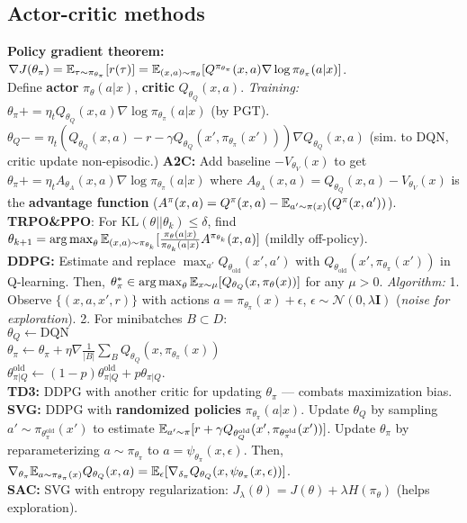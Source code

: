 \subsection{Actor-critic methods}
\textbf{Policy gradient theorem:} 
$\nabla J(\theta_\pi) = \mathbb{E}_{\tau\sim\pi_{\theta_\pi}}[r(\tau)] = \mathbb{E}_{(x,a)\sim\pi_\theta}[Q^{\pi_{\theta_\pi}}(x,a)\nabla\log\pi_{\theta_\pi}(a|x)]$.\\
Define \textbf{actor} $\pi_\theta(a|x)$, \textbf{critic} $Q_{\theta_Q}(x,a)$. \emph{Training:} $\theta_\pi \mathrel{{+}{=}} \eta_t Q_{\theta_Q}(x,a)\nabla\log\pi_{\theta_\pi}(a|x)$ (by PGT).\\
$\theta_Q \mathrel{{-}{=}} \eta_t(Q_{\theta_Q}(x,a)-r-\gamma Q_{\theta_Q}(x',\pi_{\theta_\pi}(x')))\nabla Q_{\theta_Q}(x,a)$
(sim. to DQN, critic update non-episodic.)
\textbf{A2C:} Add baseline $-V_{\theta_V}(x)$ to get
$\theta_\pi \mathrel{{+}{=}} \eta_t A_{\theta_A}(x,a)\nabla\log\pi_{\theta_\pi}(a|x)$ where $A_{\theta_A}(x,a) = Q_{\theta_Q}(x,a) - V_{\theta_V}(x)$ is the \textbf{advantage function} ($A^\pi(x,a) = Q^{\pi}(x,a)-\mathbb{E}_{a'\sim\pi(x)}(Q^{\pi}(x,a'))$).\\
\textbf{TRPO\&PPO}: For $\mathrm{KL}(\theta||\theta_k)\leq\delta$, find $\theta_{k+1} = \operatorname*{arg\,max}_\theta \mathbb{E}_{(x,a)\sim\pi_{\theta_k}}[\frac{\pi_\theta(a|x)}{\pi_{\theta_k}(a|x)}A^{\pi_{\theta_k}}(x,a)]$ (mildly off-policy).\\
\textbf{DDPG:} Estimate and replace $\max_{a'}Q_{\theta_\mathrm{old}}(x',a')$ with $Q_{\theta_{\mathrm{old}}}(x', \pi_{\theta_\pi}(x'))$ in Q-learning. Then, $\theta^*_{\pi}\in\operatorname*{arg\,max}_\theta \mathbb{E}_{x\sim\mu}[Q_{\theta_Q}(x,\pi_\theta(x))]$ for any $\mu > 0$. \emph{Algorithm:} 1. Observe $\{(x,a,x',r)\}$ with actions $a=\pi_{\theta_\pi}(x)+\epsilon$, $\epsilon\sim\mathcal{N}(0,\lambda\mathbf{I})$ (\emph{noise for exploration}). 2. For minibatches $B\subset D$:\\
$\theta_Q \leftarrow \mathrm{DQN}$\\
$\theta_\pi \leftarrow \theta_\pi +\eta\nabla\frac{1}{|B|}\sum_B Q_{\theta_Q}(x,\pi_{\theta_\pi}(x))$\\
$\theta^{\mathrm{old}}_{\pi | Q} \leftarrow (1-p)\theta^{\mathrm{old}}_{\pi | Q} + p\theta_{\pi | Q}$.\\
\textbf{TD3:} DDPG with another critic for updating $\theta_\pi$ --- combats maximization bias.\\
\textbf{SVG:} DDPG with \textbf{randomized policies} $\pi_{\theta_\pi}(a|x)$. Update $\theta_Q$ by sampling $a'\sim\pi_{\theta^\mathrm{old}_\pi}(x')$ to estimate $\mathbb{E}_{a'\sim\pi}[r+\gamma Q_{\theta^\mathrm{old}_Q}(x',\pi_{\theta^\mathrm{old}_\pi}(x'))]$. Update $\theta_\pi$ by reparameterizing $a\sim\pi_{\theta_\pi}$ to $a=\psi_{\theta_\pi}(x,\epsilon)$.
Then, $\nabla_{\theta_\pi}\mathbb{E}_{a\sim\pi_{\theta_\pi}(x)}Q_{\theta_Q}(x,a) = \mathbb{E}_\epsilon[\nabla_{\delta_\pi}Q_{\theta_Q}(x,\psi_{\theta_\pi}(x,\epsilon))]$.\\
\textbf{SAC:} SVG with entropy regularization: $J_\lambda(\theta) = J(\theta) + \lambda H(\pi_\theta)$ (helps exploration).

